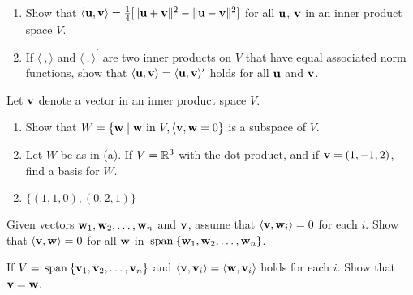 \begin{multicols}{2}
\begin{ex}
\begin{enumerate}[label={\alph*.}]
\item Show that $\langle \textbf{u}, \textbf{v} \rangle = \tfrac{1}{4}[\| \textbf{u} + \textbf{v} \| ^2 - \| \textbf{u} - \textbf{v} \| ^2]$ for all $\textbf{u}$, $\textbf{v}$ in an inner product space $V$.

\item If $\langle\ , \rangle$ and $\langle\ , \rangle^\prime$ are two inner products on $V$ that have equal associated norm functions, show that $\langle\textbf{u}, \textbf{v}\rangle = \langle\textbf{u}, \textbf{v}\rangle^\prime$ holds for all $\textbf{u}$ and $\textbf{v}$.

\end{enumerate}
\end{ex}

\begin{ex}
Let $\textbf{v}$ denote a vector in an inner product space $V$.

\begin{enumerate}[label={\alph*.}]
\item Show that $W = \{\textbf{w} \mid \textbf{w} \mbox{ in } V, \langle\textbf{v}, \textbf{w} = 0\}$ is a subspace of $V$.

\item Let $W$ be as in (a). If $V = \mathbb{R}^3$ with the dot product, and if $\textbf{v} = (1, -1, 2)$, find a basis for $W$.

\end{enumerate}
\begin{sol}
\begin{enumerate}[label={\alph*.}]
\setcounter{enumi}{1}
\item  $\{(1, 1, 0), (0, 2, 1)\}$

\end{enumerate}
\end{sol}
\end{ex}

\begin{ex} \label{ex:10_1_27}
Given vectors $\textbf{w}_{1}, \textbf{w}_{2}, \dots, \textbf{w}_{n}$ and $\textbf{v}$, assume that $\langle\textbf{v}, \textbf{w}_{i}\rangle = 0$ for each $i$. Show that $\langle\textbf{v}, \textbf{w}\rangle = 0$ for all $\textbf{w}$ in $\thinspace\operatorname{span\medspace}\{\textbf{w}_{1}, \textbf{w}_{2}, \dots, \textbf{w}_{n}\}$.
\end{ex}

\begin{ex}
If $V = \thinspace\operatorname{span\medspace}\{\textbf{v}_{1}, \textbf{v}_{2}, \dots, \textbf{v}_{n}\}$ and $\langle\textbf{v}, \textbf{v}_{i}\rangle = \langle\textbf{w}, \textbf{v}_i\rangle$ holds for each $i$. Show that $\textbf{v} = \textbf{w}$.


\end{ex}
\end{multicols}
